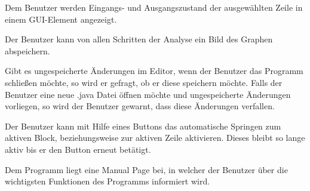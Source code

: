 Dem Benutzer werden Eingangs- und Ausgangszustand der ausgewählten Zeile in einem GUI-Element angezeigt.

Der Benutzer kann von allen Schritten der Analyse ein Bild des Graphen abspeichern.

Gibt es ungespeicherte Änderungen im Editor, wenn der Benutzer das Programm schließen möchte, so wird er gefragt, ob er diese speichern möchte.
Falls der Benutzer eine neue .java Datei öffnen möchte und ungespeicherte Änderungen vorliegen, so wird der Benutzer gewarnt, dass diese Änderungen verfallen.

Der Benutzer kann mit Hilfe eines Buttons das automatische Springen zum aktiven Block, beziehungsweise zur aktiven Zeile aktivieren. Dieses bleibt so lange aktiv bis er den Button erneut betätigt.

Dem Programm liegt eine Manual Page bei, in welcher der Benutzer über die wichtigsten Funktionen des Programms informiert wird.